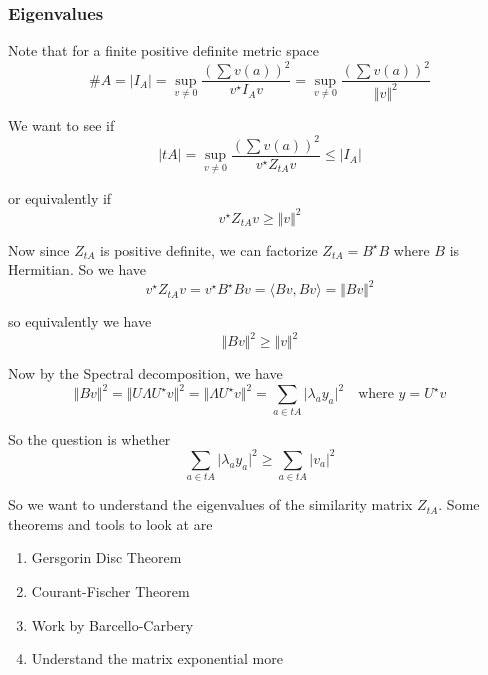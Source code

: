 \documentclass[11pt]{article}
\theoremstyle{definition}
\theoremstyle{definition}
\theoremstyle{plain}
\theoremstyle{plain}
\theoremstyle{plain}
\theoremstyle{definition}
\begin{document}
\subsubsection*{Eigenvalues}

Note that for a finite positive definite metric space
\begin{equation*}
\#A = \vert I_A \vert = \sup\limits_{v \neq 0}\frac{\left(\sum v(a)\right)^2}{v^\star I_A v} = \sup\limits_{v\neq0}\frac{\left(\sum v(a)\right)^2}{\Vert v \Vert^2}
\end{equation*}

We want to see if
\begin{equation*}
\vert tA \vert = \sup\limits_{v\neq0}\frac{\left(\sum v(a)\right)^2}{v^\star Z_{tA}v}\leq \vert I_A \vert
\end{equation*}

or equivalently if
\begin{equation*}
v^\star Z_{tA} v \geq \Vert v \Vert^2
\end{equation*}

Now since $Z_{tA}$ is positive definite, we can factorize $Z_{tA} = B^\star B$ where $B$ is Hermitian. So we have
\begin{equation*}
v^\star Z_{tA} v = v^\star B^\star B v = \langle Bv, Bv \rangle = \Vert Bv \Vert^2
\end{equation*}

so equivalently we have
\begin{equation*}
\Vert Bv \Vert^2 \geq \Vert v \Vert^2
\end{equation*}

Now by the Spectral decomposition, we have
\begin{equation*}
\Vert Bv \Vert^2 = \Vert U \Lambda U^\star v \Vert^2 = \Vert \Lambda U^\star v \Vert^2 = \sum\limits_{a \in tA} \vert \lambda_a y_a \vert^2 \quad \text{where $y = U^\star v$}
\end{equation*}

So the question is whether
\begin{equation*}
\sum\limits_{a\in tA} \vert \lambda_a y_a \vert^2 \geq \sum\limits_{a \in tA} \vert v_a \vert^2
\end{equation*}

So we want to understand the eigenvalues of the similarity matrix $Z_{tA}$. Some theorems and tools to look at are
\begin{enumerate}
\item Gersgorin Disc Theorem
\item Courant-Fischer Theorem
\item Work by Barcello-Carbery
\item Understand the matrix exponential more
\end{enumerate}
\end{document}
